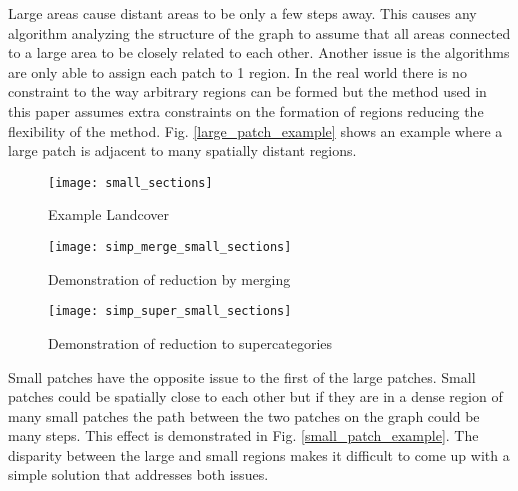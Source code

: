 \documentclass[conference]{IEEEtran}
\begin{document}
	Large areas cause distant areas to be only a few steps away. This causes any algorithm analyzing the structure of the graph to assume that all areas connected to a large area to be closely related to each other. Another issue is the algorithms are only able to assign each patch to 1 region. In the real world there is no constraint to the way arbitrary regions can be formed but the method used in this paper assumes extra constraints on the formation of regions reducing the flexibility of the method. Fig. \ref{large_patch_example} shows an example where a large patch is adjacent to many spatially distant regions. 
	
	\begin{figure*}[t!]
		\centering
		\begin{subfigure}[b]{0.3\textwidth}
			\centering
			\texttt{[image: small\_sections]}
			\caption{Example Landcover}
			\label{small_sections}
		\end{subfigure}
		\hfill
		\begin{subfigure}[b]{0.3\textwidth}
			\centering
			\texttt{[image: simp\_merge\_small\_sections]}
			\caption{Demonstration of reduction by merging}
			\label{simp_merge_small_sections}
		\end{subfigure}
		\hfill
		\begin{subfigure}[b]{0.3\textwidth}
			\centering
			\texttt{[image: simp\_super\_small\_sections]}
			\caption{Demonstration of reduction to supercategories}
			\label{simp_super_small_sections}
		\end{subfigure}
		
		\caption{This figure shows the difficulty when dealing with small patches. The patches outside of the cluster near the bottom of \ref{small_sections} can be several steps away from each other. The patches in the cluster can also be several steps away from patches within the same cluster even though they are spatially close due to the density of the cluster. This shows that the length of the path between two patches is not a rigid tool to use when comparing the similarity between the two patches. Figs. \ref{simp_merge_small_sections} and \ref{simp_super_small_sections} demonstrate reduction methods.}
		\label{small_patch_example}
	\end{figure*}
	
	Small patches have the opposite issue to the first of the large patches. Small patches could be spatially close to each other but if they are in a dense region of many small patches the path between the two patches on the graph could be many steps. This effect is demonstrated in Fig. \ref{small_patch_example}. The disparity between the large and small regions makes it difficult to come up with a simple solution that addresses both issues.
	
\end{document}
